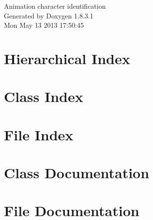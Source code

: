 \documentclass{book}
\begin{document}
\hypersetup{pageanchor=false,citecolor=blue}
\begin{titlepage}
\vspace*{7cm}
\begin{center}
{\Large Animation character identification }\\
\vspace*{1cm}
{\large Generated by Doxygen 1.8.3.1}\\
\vspace*{0.5cm}
{\small Mon May 13 2013 17:50:45}\\
\end{center}
\end{titlepage}
\clearemptydoublepage
{}
\tableofcontents
\clearemptydoublepage
{}
\hypersetup{pageanchor=true,citecolor=blue}
\chapter{Hierarchical Index}

\chapter{Class Index}

\chapter{File Index}

\chapter{Class Documentation}














\chapter{File Documentation}



















\printindex
\end{document}
